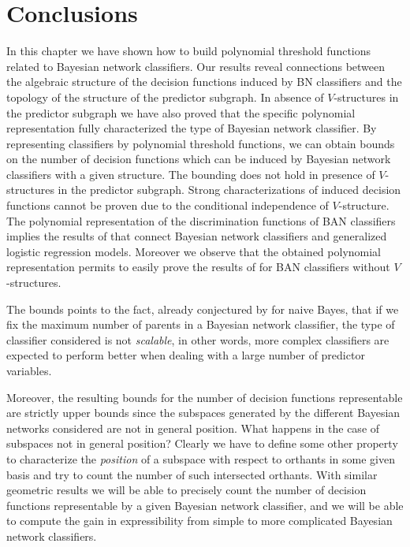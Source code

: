 \documentclass[11pt,a4paper, twoside]{book}
\begin{document}
\section{Conclusions}
\label{sec:conclusion}
In this chapter we have shown how to build polynomial threshold functions related to Bayesian network classifiers.
Our results reveal connections between the algebraic structure of the decision functions induced by BN classifiers and the topology of the structure of the predictor subgraph. 
In absence of $V$-structures in the predictor subgraph we have also proved that the specific polynomial representation fully characterized the type of Bayesian network classifier.
By representing classifiers by polynomial threshold functions, we can obtain bounds on the number of decision functions which can be induced by Bayesian network classifiers with a given structure.
The bounding does not hold in presence of $V$-structures in the predictor subgraph. Strong characterizations of induced decision functions cannot be proven due to the conditional independence of $V$-structure.
The polynomial representation of the discrimination functions of BAN classifiers implies the results of \cite{Roos2005} that connect Bayesian network classifiers and generalized logistic regression models.
Moreover we observe that the obtained polynomial representation permits to easily prove the results of \citet{Ling03} for BAN classifiers without $V$-structures.

The bounds points to the fact, already conjectured by \citet{peot} for naive Bayes, that if we fix the maximum number of parents in a Bayesian network classifier, the type of classifier considered is not \textit{scalable}, in other words, more complex classifiers are expected to perform better when dealing with a large number of predictor variables. 

Moreover, the resulting bounds for the number of decision functions representable are strictly upper bounds since the subspaces generated by the different Bayesian networks considered are not in general position. What happens in the case of subspaces not in general position? Clearly we have to define some other property to characterize the \textit{position} of a subspace with respect to orthants in some given basis and try to count the number of such intersected orthants. With similar geometric results we will be able to precisely count the number of decision functions representable  by a given Bayesian network classifier, and we will be able to compute the gain in expressibility from simple to more complicated Bayesian network classifiers. 
\end{document}
